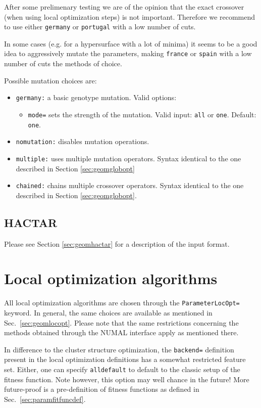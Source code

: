\documentclass[a4paper,10pt]{scrbook}
\begin{document}
After some prelimenary testing we are of the opinion that the exact crossover
(when using local optimization steps) is not important. Therefore we recommend
to use either \texttt{germany} or \texttt{portugal} with a low number of cuts.

In some cases (e.g. for a hypersurface with a lot of minima) it seems to be a
good idea to aggressively mutate the parameters, making \texttt{france} or
\texttt{spain} with a low number of cuts the methods of choice. 

Possible mutation choices are:
\begin{itemize}
  \item \texttt{germany:} a basic genotype mutation. Valid options:
  \begin{itemize}
    \item \texttt{mode=} sets the strength of the mutation. Valid input: 
\texttt{all} or \texttt{one}. Default: \texttt{one}.
  \end{itemize}
  \item \texttt{nomutation:} disables mutation operations.
  \item \texttt{multiple:} uses multiple mutation operators. Syntax identical 
to the one described in Section \ref{sec:geomglobopt}
  \item \texttt{chained:} chains multiple crossover operators. Syntax identical 
to the one described in Section \ref{sec:geomglobopt}.
\end{itemize}


\subsection{HACTAR}
Please see Section \ref{sec:geomhactar} for a description of the input format.

\section{Local optimization algorithms}
All local optimization algorithms are chosen through the
\texttt{ParameterLocOpt=} keyword. In general, the same choices are available 
as mentioned in Sec.~\ref{sec:geomlocopt}. Please note that the same 
restrictions concerning the methods obtained through the NUMAL interface apply 
as mentioned there.

In difference to the cluster structure optimization, the \texttt{backend=} 
definition present in the local optimization definitions has a somewhat 
restricted feature set. Either, one can specify \texttt{alldefault} to default 
to the classic setup of the fitness function. Note however, this option may 
well chance in the future! More future-proof is a pre-definition of fitness 
functions as defined in Sec.~\ref{sec:paramfitfuncdef}.
\end{document}
